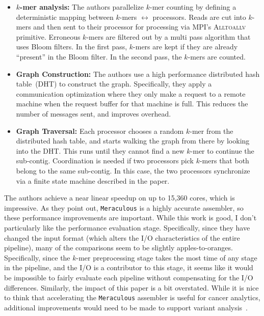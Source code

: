\documentclass[11pt]{article}
\begin{document}
\begin{itemize}
\item \textbf{$k$-mer analysis:} The authors parallelize $k$-mer counting by defining a deterministic
mapping between $k$-mers $\leftrightarrow$ processors. Reads are cut into $k$-mers and then sent to
their processor for processing via MPI's \textsc{Alltoallv} primitive. Erroneous $k$-mers are filtered out by
a multi pass algorithm that uses Bloom filters. In the first pass, $k$-mers are kept if they are already
``present'' in the Bloom filter. In the second pass, the $k$-mers are counted.
\item \textbf{Graph Construction:} The authors use a high performance distributed hash table~(DHT) to
construct the graph. Specifically, they apply a communication optimization where they only make a request
to a remote machine when the request buffer for that machine is full. This reduces the number of messages
sent, and improves overhead.
\item \textbf{Graph Traversal:} Each processor chooses a random $k$-mer from the distributed hash table,
and starts walking the graph from there by looking into the DHT. This runs until they cannot find a new
$k$-mer to continue the sub-contig. Coordination is needed if two processors pick $k$-mers that both
belong to the same sub-contig. In this case, the two processors synchronize via a finite state machine
described in the paper.
\end{itemize}

The authors achieve a near linear speedup on up to 15,360 cores, which is impressive. As they point out,
\texttt{Meraculous} is a highly accurate assembler, so these performance improvements are important.
While this work is good, I don't particularly like the performance evaluation stage. Specifically, since they
have changed the input format (which alters the I/O characteristics of the entire pipeline), many of the
comparisons seem to be slightly apples-to-oranges. Specifically, since the $k$-mer preprocessing stage
takes the most time of any stage in the pipeline, and the I/O is a contributor to this stage, it seems like it
would be impossible to fairly evaluate each pipeline without compensating for the I/O differences. Similarly,
the impact of this paper is a bit overstated. While it is nice to think that accelerating the
\texttt{Meraculous} assembler is useful for cancer analytics, additional improvements would need to be
made to support variant analysis~\cite{weisenfeld14}.



\end{document}
